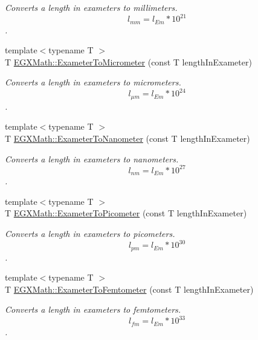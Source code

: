 \begin{DoxyCompactItemize}
\begin{DoxyCompactList}\small\item\em Converts a length in exameters to millimeters. \[ l_{mm}=l_{Em} * 10^{21} \]. \end{DoxyCompactList}\item 
{\footnotesize template$<$typename T $>$ }\\T \mbox{\hyperlink{group___e_g_x_math-_conversions-_length_conversions-_s_i-_exameter-_s_i_gaee4a8b1fa77d023e7db7180e62646388}{E\+G\+X\+Math\+::\+Exameter\+To\+Micrometer}} (const T length\+In\+Exameter)
\begin{DoxyCompactList}\small\item\em Converts a length in exameters to micrometers. \[ l_{\mu m}=l_{Em} * 10^{24} \]. \end{DoxyCompactList}\item 
{\footnotesize template$<$typename T $>$ }\\T \mbox{\hyperlink{group___e_g_x_math-_conversions-_length_conversions-_s_i-_exameter-_s_i_ga78c5c3f8008fc44c81b3d89b44d3db19}{E\+G\+X\+Math\+::\+Exameter\+To\+Nanometer}} (const T length\+In\+Exameter)
\begin{DoxyCompactList}\small\item\em Converts a length in exameters to nanometers. \[ l_{nm}=l_{Em} * 10^{27} \]. \end{DoxyCompactList}\item 
{\footnotesize template$<$typename T $>$ }\\T \mbox{\hyperlink{group___e_g_x_math-_conversions-_length_conversions-_s_i-_exameter-_s_i_gaf524e8324fedf2eb61d43ce1dc36bcac}{E\+G\+X\+Math\+::\+Exameter\+To\+Picometer}} (const T length\+In\+Exameter)
\begin{DoxyCompactList}\small\item\em Converts a length in exameters to picometers. \[ l_{pm}=l_{Em} * 10^{30} \]. \end{DoxyCompactList}\item 
{\footnotesize template$<$typename T $>$ }\\T \mbox{\hyperlink{group___e_g_x_math-_conversions-_length_conversions-_s_i-_exameter-_s_i_gaaa4f07b6d6b2e4a9e1947d4d9724c110}{E\+G\+X\+Math\+::\+Exameter\+To\+Femtometer}} (const T length\+In\+Exameter)
\begin{DoxyCompactList}\small\item\em Converts a length in exameters to femtometers. \[ l_{fm}=l_{Em} * 10^{33} \]. \end{DoxyCompactList}\item 

\end{DoxyCompactItemize}
